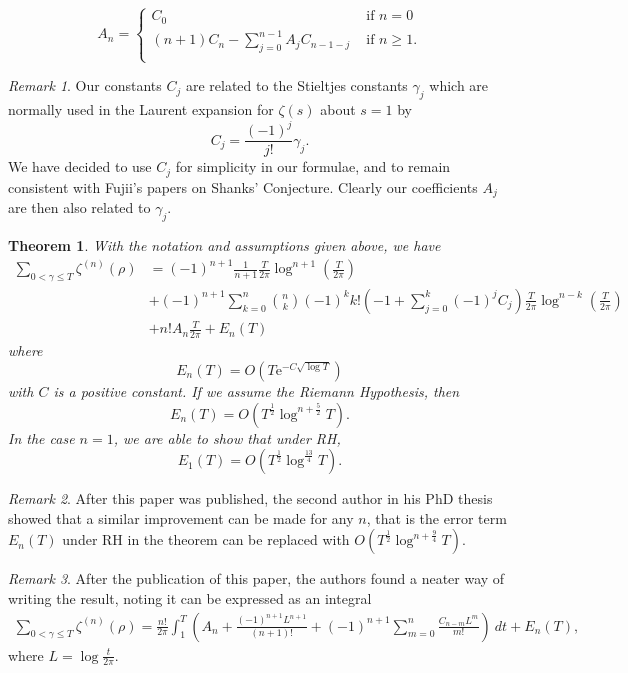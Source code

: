 \documentclass[12pt,a4paper,reqno]{amsart}
\newtheorem{theorem}{Theorem}
\theoremstyle{remark}
\newtheorem*{remark}{Remark}
\numberwithin{equation}{section}
\begin{document}
\[
A_n =
\begin{cases}
C_0 &\text{ if $n=0$}\\
(n+1)C_n - \sum_{j=0}^{n-1} A_j C_{n-1-j} &\text{ if $n \geq 1$}.\\
      \end{cases}
\]

\begin{remark}
Our constants $C_j$ are related to the Stieltjes constants $\gamma_j$ which are normally used in the Laurent expansion for $\zeta (s)$ about $s=1$ by
\[
C_j = \frac{(-1)^j}{j!}\gamma_j.
\]
We have decided to use $C_j$ for simplicity in our formulae, and to remain consistent with Fujii's papers on Shanks' Conjecture. Clearly our coefficients $A_j$ are then also related to $\gamma_j$.
\end{remark}

\begin{theorem}\label{General SC}
With the notation and assumptions given above, we have
\begin{align*}
\sum_{0 < \gamma \leq T} \zeta^{(n)} (\rho) &=
 (-1)^{n+1} \frac{1}{n+1} \frac{T}{2 \pi} \log^{n+1} \left( \frac{T}{2 \pi} \right)   \\
&+ (-1)^{n+1} \sum_{k=0}^n \binom{n}{k}  (-1)^ {k}  k!  \left(-1 + \sum_{j=0}^k (-1)^j C_j \right) \frac{T}{2 \pi} \log^{n-k} \left( \frac{T}{2 \pi} \right) \\
&+ n! A_n  \frac{T}{2 \pi}  + E_n(T)
\end{align*}
where
\[
E_n(T) = O \left(T  \mathrm{e}^{-C \sqrt{\log T}} \right)
\]
with $C$ is a positive constant. If we assume the Riemann Hypothesis, then
\[
E_n(T) = O \left(T^{\frac{1}{2}} \log^{n+\frac{5}{2}} T \right).
\]
In the case $n=1$, we are able to show that under RH, 
\[
E_1(T) = O \left(T^{\frac{1}{2}} \log^{\frac{13}{4}} T \right).
\]
\end{theorem}

\begin{remark}
    After this paper was published, the second author in his PhD thesis \cite[Section 3.1.6]{theAPC} showed that a similar improvement can be made for any $n$, that is the error term $E_n(T)$ under RH in the theorem can be replaced with $O \left(T^{\frac{1}{2}} \log^{n+\frac{9}{4}} T \right)$.
\end{remark}

\begin{remark}
    After the publication of this paper, the authors \cite{HPC} found a neater way of writing the result, noting it can be expressed as an integral
    \begin{multline*}
		\sum_{0 < \gamma \leq T} \zeta ^{(n)} (\rho) 
        =  \frac{n!}{2 \pi} \int_{1}^{T} \left( A_n + \frac{(-1)^{n+1} L^{n+1}}{(n+1)!} +(-1)^{n+1} \sum_{m=0}^{n} \frac{ C_{n-m} L^m }{m!} \right) \ dt + E_n(T),
	\end{multline*}
    where $L = \log \frac{t}{2\pi}$.

\end{remark}
\end{document}
